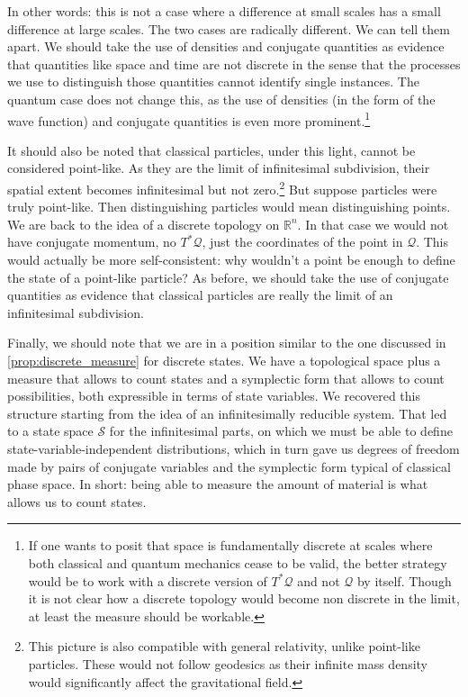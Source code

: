 \documentclass[smallextended]{svjour3}
\numberwithin{equation}{section}
\theoremstyle{definition}
\begin{document}
In other words: this is not a case where a difference at  small scales has a small difference at large scales. The two cases are radically different. We can tell them apart. We should take the use of densities and conjugate quantities as evidence that quantities like space and time are not discrete in the sense that the processes we use to distinguish those quantities cannot identify single instances. The quantum case does not change this, as the use of densities (in the form of the wave function) and conjugate quantities is even more prominent.\footnote{If one wants to posit that space is fundamentally discrete at scales where both classical and quantum mechanics cease to be valid, the better strategy would be to work with a discrete version of $T^*\mathcal{Q}$ and not $\mathcal{Q}$ by itself. Though it is not clear how a discrete topology would become non discrete in the limit, at least the measure should be workable.}

It should also be noted that classical particles, under this light, cannot be considered point-like. As they are the limit of infinitesimal subdivision, their spatial extent becomes infinitesimal but not zero.\footnote{This picture is also compatible with general relativity, unlike point-like particles. These would not follow geodesics as their infinite mass density would significantly affect the gravitational field.} But suppose particles were truly point-like. Then distinguishing particles would mean distinguishing points. We are back to the idea of a discrete topology on $\mathbb{R}^n$. In that case we would not have conjugate momentum, no $T^*\mathcal{Q}$, just the coordinates of the point in $\mathcal{Q}$. This would actually be more self-consistent: why wouldn't a point be enough to define the state of a point-like particle? As before, we should take the use of conjugate quantities as evidence that classical particles are really the limit of an infinitesimal subdivision.

Finally, we should note that we are in a position similar to the one discussed in \ref{prop:discrete_measure} for discrete states. We have a topological space plus a measure that allows to count states and a symplectic form that allows to count possibilities, both expressible in terms of state variables. We recovered this structure starting from the idea of an infinitesimally reducible system. That led to a state space $\mathcal{S}$ for the infinitesimal parts, on which we must be able to define state-variable-independent distributions, which in turn gave us degrees of freedom made by pairs of conjugate variables and the symplectic form typical of classical phase space. In short: being able to measure the amount of material is what allows us to count states.
\end{document}
